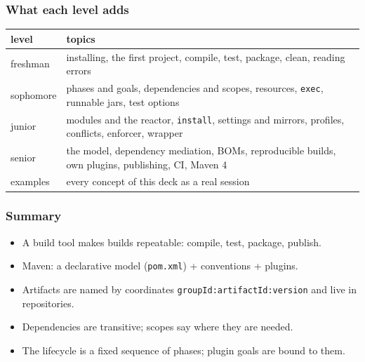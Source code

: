 \documentclass[aspectratio=169,10pt,compress]{beamer}
\begin{document}
\begin{frame}[t,fragile] \frametitle{What each level adds}
  \begin{center}\small
  \begin{tabular}{@{}lL{0.72\textwidth}@{}}
    \toprule
    \textbf{level}  & \textbf{topics} \\
    \midrule
    freshman        & installing, the first project, compile, test, package, clean, reading errors \\
    sophomore       & phases and goals, dependencies and scopes, resources, \texttt{exec}, runnable jars, test options \\
    junior          & modules and the reactor, \texttt{install}, settings and mirrors, profiles, conflicts, enforcer, wrapper \\
    senior          & the model, dependency mediation, BOMs, reproducible builds, own plugins, publishing, CI, Maven 4 \\
    examples        & every concept of this deck as a real session \\
    \bottomrule
  \end{tabular}
  \end{center}
\end{frame}





\begin{frame}[t,fragile] \frametitle{Summary}
  \begin{itemize}\small
    \item A build tool makes builds repeatable: compile, test, package, publish.
    \item Maven: a declarative model (\texttt{pom.xml}) + conventions + plugins.
    \item Artifacts are named by coordinates \texttt{groupId:artifactId:version} and live in repositories.
    \item Dependencies are transitive; scopes say where they are needed.
    \item The lifecycle is a fixed sequence of phases; plugin goals are bound to them.
  \end{itemize}
\end{frame}
\end{document}
